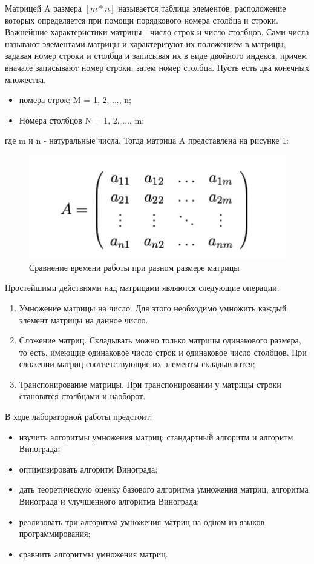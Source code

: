 \documentclass[12pt]{report}
\begin{document}
Матрицей A размера $[m*n]$ называется таблица элементов, расположение которых определяется при помощи порядкового номера столбца и строки. Важнейшие характеристики матрицы - число строк и число столбцов. Сами числа называют элементами матрицы и характеризуют их положением в матрицы, задавая номер строки и столбца и записывая их в виде двойного индекса, причем вначале записывают номер строки, затем номер столбца.
Пусть есть два конечных множества.
\begin{itemize}
	\item номера строк: M = 1, 2, ..., n;
	\item Номера столбцов N = 1, 2, ..., m;
\end{itemize}
где m и n - натуральные числа.
Тогда матрица A представлена на рисунке 1:
\begin{figure}[H]
    \centering
    \includegraphics[width=0.70\linewidth]{7.jpg}
    \caption{Сравнение времени работы при разном размере матрицы}
    \label{fig:mpr}
\end{figure}
\newline
Простейшими действиями над матрицами являются следующие операции.

\begin{enumerate}
	\item Умножение матрицы на число. Для этого необходимо умножить каждый элемент матрицы на данное число.
	\item Сложение матриц. Складывать можно только матрицы одинакового размера, то есть, имеющие  одинаковое число строк и одинаковое число столбцов. При сложении матриц соответствующие их элементы складываются;
	\item Транспонирование матрицы. При транспонировании у матрицы строки становятся столбцами и наоборот.
\end{enumerate}
В ходе лабораторной работы предстоит:
\begin{itemize}
	\item изучить алгоритмы умножения матриц: стандартный алгоритм и алгоритм Винограда;
	\item оптимизировать алгоритм Винограда;
	\item дать теоретическую оценку базового алгоритма умножения матриц, алгоритма Винограда и улучшенного алгоритма Винограда;
	\item реализовать три алгоритма умножения матриц на одном из языков программирования;
	\item сравнить алгоритмы умножения матриц.
\end{itemize}
\end{document}

